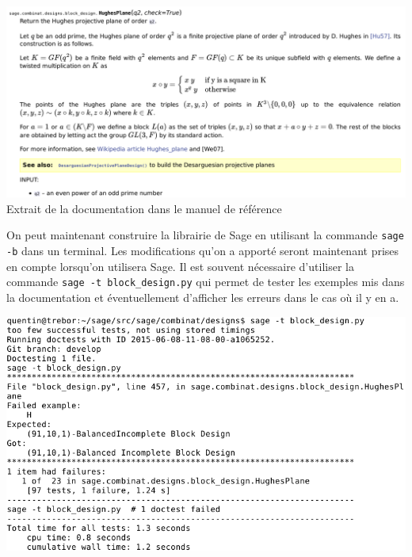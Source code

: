 \documentclass[a4paper]{article}
\begin{document}
\begin{center}
  \includegraphics[scale=0.52]{hughesdocmanual.png}\\
  Extrait de la documentation dans le manuel de référence
\end{center}
\bigskip
\begin{minipage}{0.4\linewidth}
  On peut maintenant construire la librairie de Sage en utilisant la commande \texttt{sage -b} dans un terminal. Les modifications qu'on a apporté seront maintenant prises en compte lorsqu'on utilisera Sage. Il est souvent nécessaire d'utiliser la commande \texttt{sage -t block\_design.py} qui permet de tester les exemples mis dans la documentation et éventuellement d'afficher les erreurs dans le cas où il y en a.
\end{minipage}\hfill
\begin{minipage}{0.55\linewidth}
  \includegraphics[scale=0.4]{hugheserror.png}
\end{minipage}




\newpage
\end{document}
